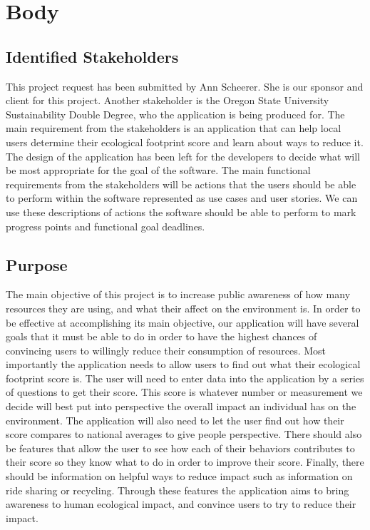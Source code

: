 \documentclass[onecolumn, draftclsnofoot,10pt, compsoc, tikz]{IEEEtran}
\def \CapstoneSponsorCompany{	Oregon State University Sustainability Double Degree}
\def \CapstoneSponsorPerson{		Ann Scheerer}
\begin{document}
\clearpage
\section{Body}

\subsection{Identified Stakeholders}
This project request has been submitted by \CapstoneSponsorPerson. She is our sponsor and client for this project.
Another stakeholder is the \CapstoneSponsorCompany, who the application is being produced for.
The main requirement from the stakeholders is an application that can help local users determine their ecological footprint score and learn about ways to reduce it.
The design of the application has been left for the developers to decide what will be most appropriate for the goal of the software.
The main functional requirements from the stakeholders will be actions that the users should be able to perform within the software  represented as use cases and user stories.
We can use these descriptions of actions the software should be able to perform to mark progress points and functional goal deadlines. 


\subsection{Purpose}
The main objective of this project is to increase public awareness of how many resources they are using, and what their affect on the environment is.
In order to be effective at accomplishing its main objective, our application will have several goals that it must be able to do in order to have the highest chances of convincing users to willingly reduce their consumption of resources.
Most importantly the application needs to allow users to find out what their ecological footprint score is.
The user will need to enter data into the application by a series of questions to get their score.
This score is whatever number or measurement we decide will best put into perspective the overall impact an individual has on the environment.
The application will also need to let the user find out how their score compares to national averages to give people perspective.
There should also be features that allow the user to see how each of their behaviors contributes to their score so they know what to do in order to improve their score.
Finally, there should be information on helpful ways to reduce impact such as information on ride sharing or recycling.
Through these features the application aims to bring awareness to human ecological impact, and convince users to try to reduce their impact.
\end{document}
